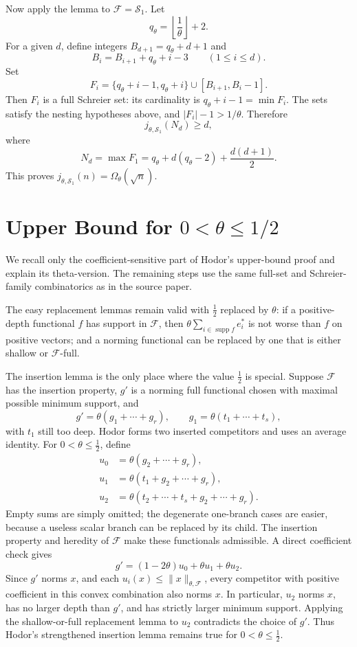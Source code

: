 \documentclass[11pt]{article}
\newcommand{\cF}{\mathcal F}
\newcommand{\cS}{\mathcal S}
\newcommand{\supp}{\operatorname{supp}}
\begin{document}
Now apply the lemma to \(\cF=\cS_1\).  Let
\[
  q_\theta=\left\lfloor\frac1\theta\right\rfloor+2.
\]
For a given \(d\), define integers \(B_{d+1}=q_\theta+d+1\) and
\[
  B_i=B_{i+1}+q_\theta+i-3 \qquad (1\leq i\leq d).
\]
Set
\[
  F_i=\{q_\theta+i-1,q_\theta+i\}\cup [B_{i+1},B_i-1].
\]
Then \(F_i\) is a full Schreier set: its cardinality is
\(q_\theta+i-1=\min F_i\).  The sets satisfy the nesting hypotheses above,
and \(|F_i|-1>1/\theta\).  Therefore
\[
  j_{\theta,\cS_1}(N_d)\geq d,
\]
where
\[
  N_d=\max F_1
      =q_\theta+d(q_\theta-2)+\frac{d(d+1)}2.
\]
This proves \(j_{\theta,\cS_1}(n)=\Omega_\theta(\sqrt n)\).

\section*{Upper Bound for \(0<\theta\leq 1/2\)}

We recall only the coefficient-sensitive part of Hodor's upper-bound proof and
explain its theta-version.  The remaining steps use the same full-set and
Schreier-family combinatorics as in the source paper.

The easy replacement lemmas remain valid with \(\frac12\) replaced by
\(\theta\): if a positive-depth functional \(f\) has support in \(\cF\), then
\(\theta\sum_{i\in\supp f}e_i^*\) is not worse than \(f\) on positive vectors;
and a norming functional can be replaced by one that is either shallow or
\(\cF\)-full.

The insertion lemma is the only place where the value \(\frac12\) is special.
Suppose \(\cF\) has the insertion property, \(g'\) is a norming full
functional chosen with maximal possible minimum support, and
\[
  g'=\theta(g_1+\cdots+g_r), \qquad
  g_1=\theta(t_1+\cdots+t_s),
\]
with \(t_1\) still too deep.  Hodor forms two inserted competitors and uses an
average identity.  For \(0<\theta\leq\frac12\), define
\[
\begin{aligned}
  u_0&=\theta(g_2+\cdots+g_r),\\
  u_1&=\theta(t_1+g_2+\cdots+g_r),\\
  u_2&=\theta(t_2+\cdots+t_s+g_2+\cdots+g_r).
\end{aligned}
\]
Empty sums are simply omitted; the degenerate one-branch cases are easier,
because a useless scalar branch can be replaced by its child.  The insertion
property and heredity of \(\cF\) make these functionals admissible.  A direct
coefficient check gives
\[
  g'=(1-2\theta)u_0+\theta u_1+\theta u_2.
\]
Since \(g'\) norms \(x\), and each \(u_i(x)\leq \|x\|_{\theta,\cF}\), every
competitor with positive coefficient in this convex combination also norms
\(x\).  In particular, \(u_2\) norms \(x\), has no larger depth than \(g'\),
and has strictly larger minimum support.  Applying the shallow-or-full
replacement lemma to \(u_2\) contradicts the choice of \(g'\).  Thus Hodor's
strengthened insertion lemma remains true for \(0<\theta\leq\frac12\).
\end{document}
